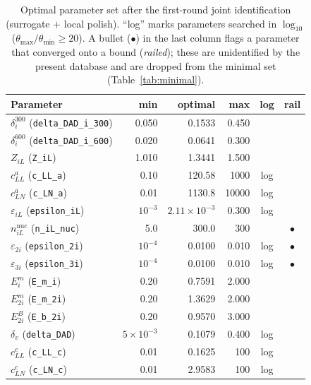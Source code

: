 \documentclass{article}
\begin{document}
\begin{table}[h!]
\centering
\caption{Optimal parameter set after the first-round joint identification
(surrogate $+$ local polish). ``log'' marks parameters searched in $\log_{10}$
($\theta_{\max}/\theta_{\min}\ge 20$). A bullet ($\bullet$) in the last column
flags a parameter that converged onto a bound (\emph{railed}); these are
unidentified by the present database and are dropped from the minimal set
(Table~\ref{tab:minimal}).}
\label{tab:optimal}
\renewcommand{\arraystretch}{1.15}
\small
\begin{tabular}{l r r r c c}
\hline
\textbf{Parameter} & \textbf{min} & \textbf{optimal} & \textbf{max} & \textbf{log} & \textbf{rail}\\
\hline
$\delta_i^{300}$ (\texttt{delta\_DAD\_i\_300}) & 0.050 & 0.1533 & 0.450 & & \\
$\delta_i^{600}$ (\texttt{delta\_DAD\_i\_600}) & 0.020 & 0.0641 & 0.300 & & \\
$Z_{iL}$ (\texttt{Z\_iL})                      & 1.010 & 1.3441 & 1.500 & & \\
$c_{LL}^{a}$ (\texttt{c\_LL\_a})               & 0.10 & 120.58 & 1000 & log & \\
$c_{LN}^{a}$ (\texttt{c\_LN\_a})               & 0.01 & 1130.8 & 10000 & log & \\
$\varepsilon_{iL}$ (\texttt{epsilon\_iL})      & $10^{-3}$ & $2.11\times10^{-3}$ & 0.300 & log & \\
$n_{iL}^{\mathrm{nuc}}$ (\texttt{n\_iL\_nuc})  & 5.0 & 300.0 & 300 & & $\bullet$\\
$\varepsilon_{2i}$ (\texttt{epsilon\_2i})      & $10^{-4}$ & 0.0100 & 0.010 & log & $\bullet$\\
$\varepsilon_{3i}$ (\texttt{epsilon\_3i})      & $10^{-4}$ & 0.0100 & 0.010 & log & $\bullet$\\
$E^m_i$ (\texttt{E\_m\_i})                      & 0.20 & 0.7591 & 2.000 & & \\
$E^m_{2i}$ (\texttt{E\_m\_2i})                  & 0.20 & 1.3629 & 2.000 & & \\
$E^B_{2i}$ (\texttt{E\_b\_2i})                  & 0.20 & 0.9570 & 3.000 & & \\
$\delta_v$ (\texttt{delta\_DAD})               & $5\times10^{-3}$ & 0.1079 & 0.400 & log & \\
$c_{LL}^{c}$ (\texttt{c\_LL\_c})               & 0.01 & 0.1625 & 100 & log & \\
$c_{LN}^{c}$ (\texttt{c\_LN\_c})               & 0.01 & 2.9583 & 100 & log & \\

\end{tabular}
\end{table}
\end{document}
